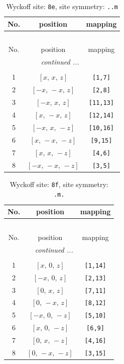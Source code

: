 \documentclass[fleqn,8pt]{jsarticle}
\begin{document}
\begin{longtable}{ccc}
\caption{Wyckoff site: {\tt 8e}, site symmetry: {\tt ..m}}
 \\
 \hline \hline
No. & position & mapping \\ \hline \endfirsthead

\multicolumn{2}{l}{\tablename\ \thetable{}} \\
 \hline \hline
No. & position & mapping \\ \hline \endhead

 \hline \hline
\multicolumn{2}{r}{\footnotesize\it continued ...} \\ \endfoot

 \hline \hline
\multicolumn{2}{r}{} \\ \endlastfoot

1 & $\left[ x,\, x,\, z \right]$ & {\tt [1,7]} \\ \hline
2 & $\left[ - x,\, - x,\, z \right]$ & {\tt [2,8]} \\ \hline
3 & $\left[ - x,\, x,\, z \right]$ & {\tt [11,13]} \\ \hline
4 & $\left[ x,\, - x,\, z \right]$ & {\tt [12,14]} \\ \hline
5 & $\left[ - x,\, x,\, - z \right]$ & {\tt [10,16]} \\ \hline
6 & $\left[ x,\, - x,\, - z \right]$ & {\tt [9,15]} \\ \hline
7 & $\left[ x,\, x,\, - z \right]$ & {\tt [4,6]} \\ \hline
8 & $\left[ - x,\, - x,\, - z \right]$ & {\tt [3,5]} \\
\end{longtable}
\renewcommand{\arraystretch}{1.2}
\begin{longtable}{ccc}
\caption{Wyckoff site: {\tt 8f}, site symmetry: {\tt .m.}}
 \\
 \hline \hline
No. & position & mapping \\ \hline \endfirsthead

\multicolumn{2}{l}{\tablename\ \thetable{}} \\
 \hline \hline
No. & position & mapping \\ \hline \endhead

 \hline \hline
\multicolumn{2}{r}{\footnotesize\it continued ...} \\ \endfoot

 \hline \hline
\multicolumn{2}{r}{} \\ \endlastfoot

1 & $\left[ x,\, 0,\, z \right]$ & {\tt [1,14]} \\ \hline
2 & $\left[ - x,\, 0,\, z \right]$ & {\tt [2,13]} \\ \hline
3 & $\left[ 0,\, x,\, z \right]$ & {\tt [7,11]} \\ \hline
4 & $\left[ 0,\, - x,\, z \right]$ & {\tt [8,12]} \\ \hline
5 & $\left[ - x,\, 0,\, - z \right]$ & {\tt [5,10]} \\ \hline
6 & $\left[ x,\, 0,\, - z \right]$ & {\tt [6,9]} \\ \hline
7 & $\left[ 0,\, x,\, - z \right]$ & {\tt [4,16]} \\ \hline
8 & $\left[ 0,\, - x,\, - z \right]$ & {\tt [3,15]} \\
\end{longtable}
\end{document}
